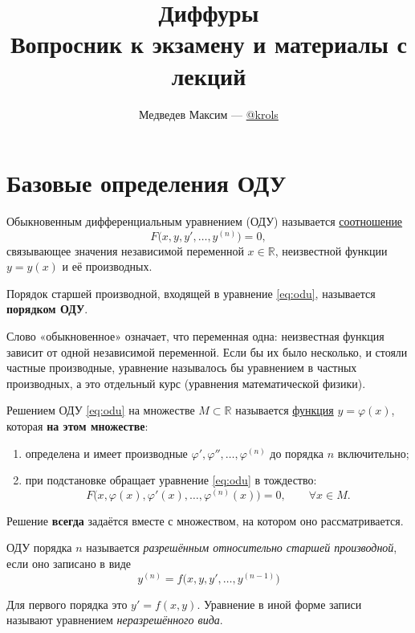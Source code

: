 \documentclass[12pt,a4paper]{article}
\title{\textbf{Диффуры}\\[0.3em]\large Вопросник к экзамену и материалы с лекций}
\author{Медведев Максим --- \href{https://t.me/krols}{@krols}}
\date{}
\numberwithin{equation}{section}
\newcommand{\R}{\mathbb{R}}
\begin{document}
\maketitle
\begingroup
\small
\tableofcontents
\endgroup
\clearpage

\section{Базовые определения ОДУ}

\begin{definitionHSE}
Обыкновенным дифференциальным уравнением (ОДУ) называется \underline{соотношение}
\begin{equation}
F\bigl(x,y,y',\ldots,y^{(n)}\bigr)=0,
\label{eq:odu}
\end{equation}
связывающее значения независимой переменной $x\in\R$, неизвестной функции $y=y(x)$ и её производных.

Порядок старшей производной, входящей в уравнение \eqref{eq:odu}, называется \textbf{порядком ОДУ}.
\end{definitionHSE}

Слово «обыкновенное» означает, что переменная одна: неизвестная функция зависит от одной независимой переменной. Если бы их было несколько, и стояли частные производные, уравнение называлось бы уравнением в частных производных, а это отдельный курс (уравнения математической физики).

\begin{definitionHSE}
Решением ОДУ \eqref{eq:odu} на множестве $M\subset\R$ называется \underline{функция} $y=\varphi(x)$, которая \textbf{на этом множестве}:
\begin{enumerate}
  \item определена и имеет производные \(\varphi',\varphi'',\ldots,\varphi^{(n)}\) до порядка $n$ включительно;
  \item при подстановке обращает уравнение \eqref{eq:odu} в тождество:
  \[
  F\bigl(x,\varphi(x),\varphi'(x),\ldots,\varphi^{(n)}(x)\bigr)=0,
  \qquad \forall x\in M.
  \]
\end{enumerate}
\end{definitionHSE}

Решение \textbf{всегда} задаётся вместе с множеством, на котором оно рассматривается.

\begin{definitionHSE}
ОДУ порядка \(n\) называется \textit{разрешённым относительно старшей
производной}, если оно записано в виде
\[
y^{(n)}=f\bigl(x,y,y',\ldots,y^{(n-1)}\bigr)
\]
\end{definitionHSE}
Для первого порядка это \(y'=f(x,y)\). Уравнение в иной форме записи называют уравнением \textit{неразрешённого вида}.
\end{document}
